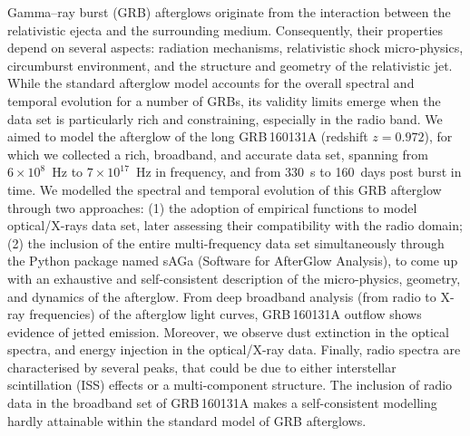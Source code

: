 \documentclass{aa}
\begin{document}
\abstract
{Gamma--ray burst (GRB) afterglows originate from the interaction between the relativistic ejecta and the surrounding medium. Consequently, their properties depend on several aspects: radiation mechanisms, relativistic shock micro-physics, circumburst environment, and the structure and geometry of the relativistic jet. While the standard afterglow model accounts for the overall spectral and temporal evolution for a number of GRBs, its validity limits emerge when the data set is particularly rich and constraining, especially in the radio band.}
{We aimed to model the afterglow of the long GRB\,160131A (redshift $z=0.972$), for which we collected a rich, broadband, and accurate data set, spanning from $6\times10^{8}$~Hz to $7\times10^{17}$~Hz in frequency, and from 330~s to 160~days post burst in time.}
{We modelled the spectral and temporal evolution of this GRB afterglow through two approaches: (1) the adoption of empirical functions to model optical/X-rays data set, later assessing their compatibility with the radio domain; (2) the inclusion of the entire multi-frequency data set simultaneously through the Python package named {\sc sAGa} (Software for AfterGlow Analysis), to come up with an exhaustive and self-consistent description of the micro-physics, geometry, and dynamics of the afterglow.
}
{From deep broadband analysis (from radio to X-ray frequencies) of the afterglow light curves, GRB\,160131A outflow shows evidence of jetted emission.
Moreover, we observe dust extinction in the optical spectra, and energy injection in the optical/X-ray data.
Finally, radio spectra are characterised by several peaks, that could be due to either interstellar scintillation (ISS) effects or a multi-component structure.}
{The inclusion of radio data in the broadband set of GRB\,160131A makes a self-consistent modelling hardly attainable within the standard model of GRB afterglows.}




\maketitle

%
\end{document}

